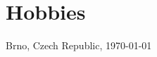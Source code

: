 \documentclass[11pt,a4paper]{moderncv}
\begin{document}
\section{Hobbies}
\renewcommand{\listitemsymbol}{\Neutral}

\renewcommand{\refname}{Publications, talks}
\makeatletter
\def\mybiblabel#1(#2){\hskip 0pt plus 1filll\relax #2}
\def\@biblabel#1{\mybiblabel #1}
\makeatother
\nocite{*}



\vfill
Brno, Czech Republic, \today
\end{document}

